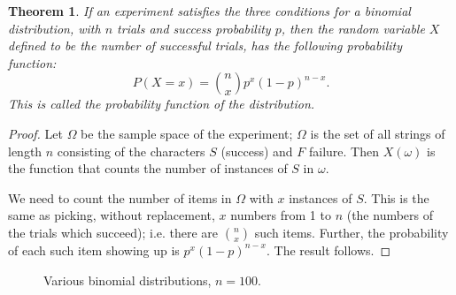\documentclass[a4paper,leqno]{article}
\numberwithin{equation}{section}
\newtheorem{thm}[equation]{Theorem}
\theoremstyle{definition}
\theoremstyle{remark}
\begin{document}
\begin{thm}
  If an experiment satisfies the three conditions for a binomial distribution, with $ n $ trials and success probability $ p $,
  then the random variable $ X $ defined to be the number of successful trials, has the following probability function:
  \begin{displaymath}
    P(X = x) = \binom{n}{x} p^x (1-p)^{n-x}.
  \end{displaymath}
  This is called the probability function of the distribution.
\end{thm}
\begin{proof}
  Let $ \Omega $ be the sample space of the experiment; $ \Omega $ is the set of all strings of length $ n $ consisting
  of the characters $ S $ (success) and $ F $ failure. Then $ X(\omega) $ is the function that counts the number of instances
  of $ S $ in $ \omega $.

  We need to count the number of items in $ \Omega $ with $ x $ instances of $ S $. This is the same as picking, without
  replacement, $ x $ numbers from 1 to $ n $ (the numbers of the trials which succeed); i.e. there are $ \binom{n}{x} $
  such items. Further, the probability of each such item showing up is $ p^x (1 - p)^{n - x} $. The result follows.
\end{proof}

\begin{figure}
  \centering
  \caption{Various binomial distributions, $ n = 100 $.\label{fig:binomial}}
\end{figure}
\end{document}
